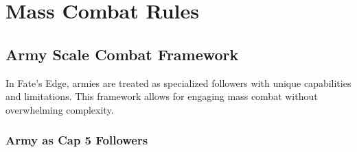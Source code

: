 \documentclass[11pt,letterpaper]{article}
\begin{document}
\tableofcontents
\newpage

\section{Mass Combat Rules}

\subsection{Army Scale Combat Framework}

In Fate's Edge, armies are treated as specialized followers with unique capabilities and limitations. This framework allows for engaging mass combat without overwhelming complexity.

\subsubsection{Army as Cap 5 Followers}
\end{document}
